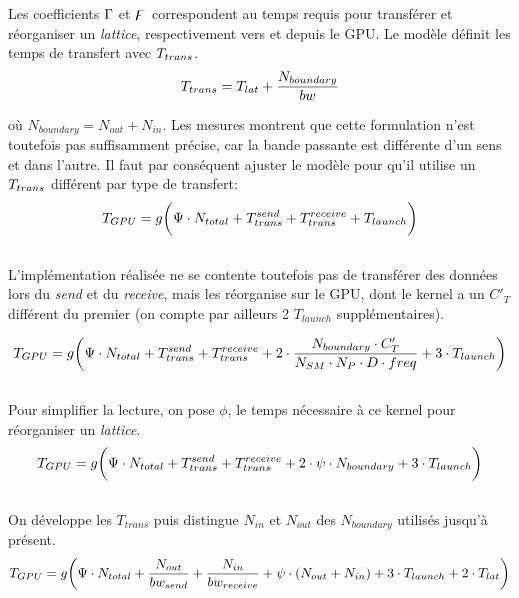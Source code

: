 Les coefficients  $\Gamma$ et $\digamma$ correspondent au temps requis pour transférer et réorganiser un \textit{lattice}, respectivement vers et depuis le \acs{GPU}. Le modèle définit les temps de transfert avec $T_{trans}$.
\begin{equation}
T_{trans} = T_{lat}+ \frac{N_{boundary}}{bw}
\end{equation}

où $N_{boundary} = N_{out} +  N_{in}$. Les mesures montrent que cette formulation n'est toutefois pas suffisamment précise, car la bande passante est différente d'un sens et dans l'autre. Il faut par conséquent ajuster le modèle pour qu'il utilise un $T_{trans}$ différent par type de transfert:
\begin{equation}
T_{GPU} = g \bigg( \Psi \cdot N_{total} + T^{send}_{trans} + T^{receive}_{trans} + T_{launch}  \bigg)
\end{equation}\\[-\baselineskip]

L'implémentation réalisée ne se contente toutefois pas de transférer des données lors du \textit{send} et du \textit{receive}, mais les réorganise sur le \acs{GPU}, dont le kernel a un $C'_T$ différent du premier (on compte par ailleurs 2 $T_{launch}$ supplémentaires).

\begin{equation}
T_{GPU} = g \bigg( \Psi \cdot N_{total} + T^{send}_{trans} + T^{receive}_{trans} + 2\cdot\frac{N_{boundary}\cdot C'_T}{N_{SM}\cdot N_P \cdot D \cdot freq} + 3\cdot T_{launch}  \bigg)
\end{equation}\\[-\baselineskip]

Pour simplifier la lecture, on pose $\phi$, le temps nécessaire à ce kernel pour réorganiser un \textit{lattice}.
\begin{equation}
T_{GPU} = g \bigg( \Psi \cdot N_{total}  + T^{send}_{trans} + T^{receive}_{trans} + 2\cdot\psi\cdot N_{boundary} + 3\cdot T_{launch} \bigg)
\end{equation}\\[-\baselineskip]

\noindent On développe les $T_{trans}$ puis distingue $N_{in}$ et $N_{out}$ des $N_{boundary}$ utilisés jusqu'à présent.
\begin{equation}
T_{GPU} = g \bigg( \Psi \cdot N_{total}  + \frac{N_{out}}{bw_{send}} + \frac{N_{in}}{bw_{receive}} + \psi\cdot (N_{out}+N_{in}) + 3\cdot T_{launch} +2\cdot T_{lat}\bigg)
\end{equation}\\[-\baselineskip]


